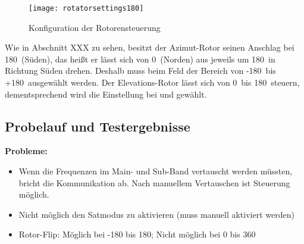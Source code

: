 \begin{figure}[h]
	\centering
	\texttt{[image: rotatorsettings180]}
	\caption{Konfiguration der Rotorensteuerung}
	\label{fig:rotatorconfig} 
\end{figure}

Wie in Abschnitt XXX zu sehen, besitzt der Azimut-Rotor seinen Anschlag bei 180\mydegree\ (Süden), das heißt er lässt sich von 0\mydegree\ (Norden) aus jeweils um 180\mydegree\ in Richtung Süden drehen. Deshalb muss beim Feld  der Bereich von -180\mydegree\ bis +180\mydegree\ ausgewählt werden. Der Elevations-Rotor lässt sich von 0\mydegree\ bis 180\mydegree\ steuern, dementsprechend wird die Einstellung bei  und  gewählt.

\subsection{Probelauf und Testergebnisse}

\textbf{Probleme:}
\begin{itemize}
	\parskip0pt
	\item Wenn die Frequenzen im Main- und Sub-Band vertauscht werden müssten, bricht die Kommunikation ab. Nach manuellem Vertauschen ist Steuerung möglich.
	\item Nicht möglich den Satmodus zu aktivieren (muss manuell aktiviert werden)
	\item Rotor-Flip: Möglich bei -180 bis 180; Nicht möglich bei 0 bis 360
\end{itemize}




